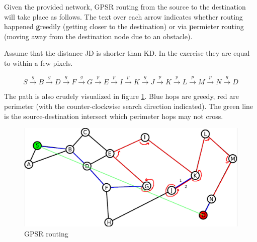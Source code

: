 \documentclass[a4paper]{scrreprt}
\begin{document}
Given the provided network, GPSR routing from the source to the destination
will take place as follows. The text over each arrow indicates whether routing
happened \textbf{g}reedily (getting closer to the destination) or via
\textbf{p}ermieter routing (moving away from the destination node due to an
obstacle).

Assume that the distance JD is shorter than KD. In the exercise they are equal
to within a few pixels.

\[
		S \xrightarrow{g} B \xrightarrow{g} D \xrightarrow{g} F \xrightarrow{g}
		G \xrightarrow{p} E \xrightarrow{p} I \xrightarrow{p} K \xrightarrow{g}
		J \xrightarrow{p} K \xrightarrow{p} L \xrightarrow{p} M \xrightarrow{p}
		N \xrightarrow{g} D
\]

The path is also crudely visualized in figure \ref{fig:gpsr_routing}. Blue hops
are greedy, red are perimeter (with the counter-clockwise search direction
indicated).  The green line is the source-destination intersect which perimeter
hops may not cross.

\begin{figure}[h]
        \centering
        \includegraphics[width=\textwidth]{network}
        \caption{GPSR routing}
        \label{fig:gpsr_routing}
\end{figure}
\end{document}
